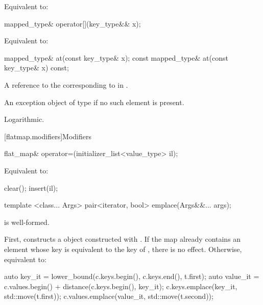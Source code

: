 \begin{codeblock}
\begin{codeblock}
\begin{codeblock}
\begin{addedblock}
\begin{itemdescr}
\pnum
\effects
Equivalent to: 
\end{itemdescr}

%
\begin{itemdecl}
mapped_type& operator[](key_type&& x);
\end{itemdecl}

\begin{itemdescr}
\pnum
\effects
Equivalent to: 
\end{itemdescr}

%
\begin{itemdecl}
mapped_type&       at(const key_type& x);
const mapped_type& at(const key_type& x) const;
\end{itemdecl}

\begin{itemdescr}
\pnum
\returns
A reference to the  corresponding to  in .

\pnum
\throws
An exception object of type  if
no such element is present.

\pnum
\complexity Logarithmic.
\end{itemdescr}

[flatmap.modifiers]{Modifiers}

%
\begin{itemdecl}
flat_map& operator=(initializer_list<value_type> il);
\end{itemdecl}

\begin{itemdescr}
\pnum
\effects Equivalent to:
\begin{codeblock}
clear();
insert(il);
\end{codeblock}
\end{itemdescr}

%
\begin{itemdecl}
template <class... Args> pair<iterator, bool> emplace(Args&&... args);
\end{itemdecl}

\begin{itemdescr}
\pnum \constraints {} is well-formed.

\pnum
\effects
First, constructs a  object 
constructed with .  If the map already
contains an element whose key is equivalent to the key of , there is
no effect.  Otherwise, equivalent to:
\begin{codeblock}
auto key_it = lower_bound(c.keys.begin(), c.keys.end(), t.first);
auto value_it = c.values.begin() + distance(c.keys.begin(), key_it);
c.keys.emplace(key_it, std::move(t.first));
c.values.emplace(value_it, std::move(t.second));
\end{codeblock}


\end{itemdescr}
\end{addedblock}
\end{codeblock}
\end{codeblock}
\end{codeblock}
